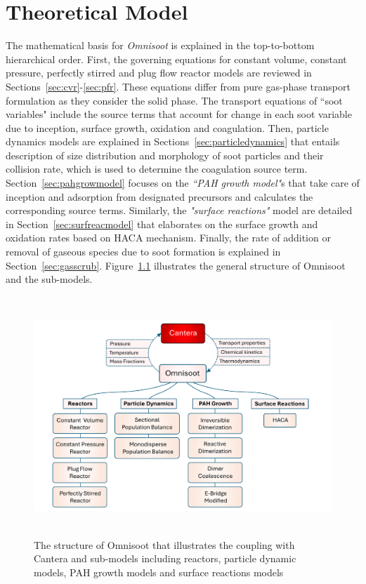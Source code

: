 \chapter{Theoretical Model}
The mathematical basis for \textit{Omnisoot} is explained in the top-to-bottom hierarchical order. First, the governing equations for constant volume, constant pressure, perfectly stirred and plug flow reactor models are reviewed in Sections~\ref{sec:cvr}-\ref{sec:pfr}. These equations differ from pure gas-phase transport formulation as they consider the solid phase. The transport equations of ``soot variables" include the source terms that account for change in each soot variable due to inception, surface growth, oxidation and coagulation. Then, particle dynamics models are explained in Sections~\ref{sec:particledynamics} that entails description of size distribution and morphology of soot particles and their collision rate, which is used to determine the coagulation source term. Section~\ref{sec:pahgrowmodel} focuses on the \textit{``PAH growth model"}s that take care of inception and adsorption from designated precursors and calculates the corresponding source terms. Similarly, the \textit{"surface reactions"} model are detailed in Section~\ref{sec:surfreacmodel} that elaborates on the surface growth and oxidation rates based on HACA mechanism. Finally, the rate of addition or removal of gaseous species due to soot formation is explained in Section~\ref{sec:gasscrub}. Figure~\ref{fig:structure} illustrates the general structure of Omnisoot and the sub-models.

\begin{figure}[!htbp]
	\centering
	\includegraphics[height=90mm, ]{Figures/Theory/structure.pdf}
	\caption{The structure of Omnisoot that illustrates the coupling with Cantera and sub-models including reactors, particle dynamic models, PAH growth models and surface reactions models}
	\label{fig:structure}
\end{figure}


